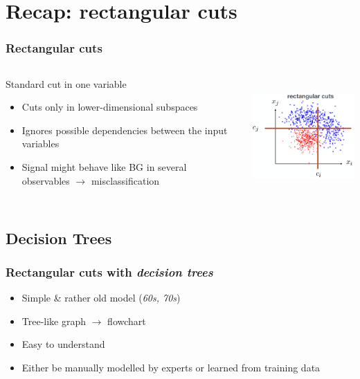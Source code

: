 \documentclass{beamer}
\begin{document}
\section{Recap: rectangular cuts} %
\begin{frame}
    \frametitle{Rectangular cuts}
    \begin{columns}[T] %
        \begin{column}{.48\textwidth}
            \vspace*{-10mm}
            Standard cut in one variable
            \begin{itemize}
                \item<1-> Cuts only in lower-dimensional subspaces
                \item<2-> Ignores possible dependencies between the input variables
                \item<3-> Signal might behave like BG in several observables $\to$ misclassification
            \end{itemize}
        \end{column}%
        \hfill%
        \begin{column}{.48\textwidth}
            \vspace*{-10mm}
            \hspace*{-10mm}
            \includegraphics[height=4.5cm,keepaspectratio]{pics/mva_cuts_rectangular.png}%
            
        \end{column}%
    \end{columns}

\end{frame}


\subsection{Decision Trees}
\begin{frame}
    \frametitle{Rectangular cuts with \emph{decision trees}}
    \vspace*{-7mm}
    \begin{itemize}
        \item Simple \& rather old model (\emph{60s, 70s})
        \item Tree-like graph $\to$ flowchart
        \item Easy to understand
        \item Either be manually modelled by experts or learned from training data
    \end{itemize}
\end{frame}
\end{document}
